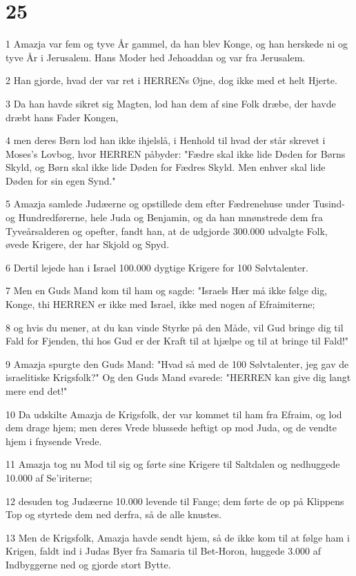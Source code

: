 \chapter{25}

\par 1 Amazja var fem og tyve År gammel, da han blev Konge, og han herskede ni og tyve År i Jerusalem. Hans Moder hed Jehoaddan og var fra Jerusalem.
\par 2 Han gjorde, hvad der var ret i HERRENs Øjne, dog ikke med et helt Hjerte.
\par 3 Da han havde sikret sig Magten, lod han dem af sine Folk dræbe, der havde dræbt hans Fader Kongen,
\par 4 men deres Børn lod han ikke ihjelslå, i Henhold til hvad der står skrevet i Moses's Lovbog, hvor HERREN påbyder: "Fædre skal ikke lide Døden for Børns Skyld, og Børn skal ikke lide Døden for Fædres Skyld. Men enhver skal lide Døden for sin egen Synd."
\par 5 Amazja samlede Judæerne og opstillede dem efter Fædrenehuse under Tusind- og Hundredførerne, hele Juda og Benjamin, og da han mnønstrede dem fra Tyveårsalderen og opefter, fandt han, at de udgjorde 300.000 udvalgte Folk, øvede Krigere, der har Skjold og Spyd.
\par 6 Dertil lejede han i Israel 100.000 dygtige Krigere for 100 Sølvtalenter.
\par 7 Men en Guds Mand kom til ham og sagde: "Israels Hær må ikke følge dig, Konge, thi HERREN er ikke med Israel, ikke med nogen af Efraimiterne;
\par 8 og hvis du mener, at du kan vinde Styrke på den Måde, vil Gud bringe dig til Fald for Fjenden, thi hos Gud er der Kraft til at hjælpe og til at bringe til Fald!"
\par 9 Amazja spurgte den Guds Mand: "Hvad så med de 100 Sølvtalenter, jeg gav de israelitiske Krigsfolk?" Og den Guds Mand svarede: "HERREN kan give dig langt mere end det!"
\par 10 Da udskilte Amazja de Krigsfolk, der var kommet til ham fra Efraim, og lod dem drage hjem; men deres Vrede blussede heftigt op mod Juda, og de vendte hjem i fnysende Vrede.
\par 11 Amazja tog nu Mod til sig og førte sine Krigere til Saltdalen og nedhuggede 10.000 af Se'iriterne;
\par 12 desuden tog Judæerne 10.000 levende til Fange; dem førte de op på Klippens Top og styrtede dem ned derfra, så de alle knustes.
\par 13 Men de Krigsfolk, Amazja havde sendt hjem, så de ikke kom til at følge ham i Krigen, faldt ind i Judas Byer fra Samaria til Bet-Horon, huggede 3.000 af Indbyggerne ned og gjorde stort Bytte.
